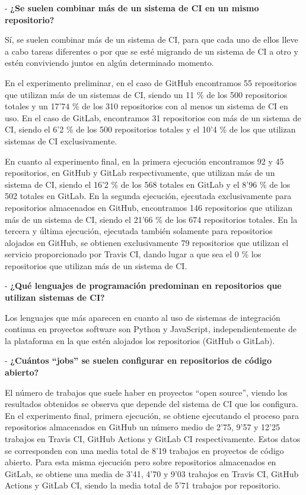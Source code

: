 - \textbf{¿Se suelen combinar más de un sistema de CI en un mismo repositorio?}

Sí, se suelen combinar más de un sistema de CI, para que cada uno de ellos lleve a cabo tareas diferentes o por que se esté migrando de un sistema de CI a otro y estén conviviendo juntos en algún determinado momento.

En el experimento preliminar, en el caso de GitHub encontramos 55 repositorios que utilizan más de un sistemas de CI, siendo un 11 \% de los 500 repositorios totales y un 17'74 \% de los 310 repositorios con al menos un sistema de CI en uso. En el caso de GitLab, encontramos 31 repositorios con más de un sistema de CI, siendo el 6'2 \% de los 500 repositorios totales y el 10'4 \% de los que utilizan sistemas de CI exclusivamente.

En cuanto al experimento final, en la primera ejecución encontramos 92 y 45 repositorios, en GitHub y GitLab respectivamente, que utilizan más de un sistema de CI, siendo el 16'2 \% de los 568 totales en GitLab y el 8'96 \% de los 502 totales en GitLab. En la segunda ejecución, ejecutada exclusivamente para repositorios almacenados en GitHub, encontramos 146 repositorios que utilizan más de un sistema de CI, siendo el 21'66 \% de los 674 repositorios totales. En la tercera y última ejecución, ejecutada también solamente para repositorios alojados en GitHub, se obtienen exclusivamente 79 repositorios que utilizan el servicio proporcionado por Travis CI, dando lugar a que sea el 0 \% los repositorios que utilizan más de un sistema de CI.

- \textbf{¿Qué lenguajes de programación predominan en repositorios que utilizan sistemas de CI?}

Los lenguajes que más aparecen en cuanto al uso de sistemas de integración continua en proyectos software son Python y JavaScript, independientemente de la plataforma en la que estén alojados los repositorios (GitHub o GitLab).

- \textbf{¿Cuántos ``jobs'' se suelen configurar en repositorios de código abierto?}

El número de trabajos que suele haber en proyectos ``open source'', viendo los resultados obtenidos se observa que depende del sistema de CI que los configura. En el experimento final, primera ejecución, se obtiene ejecutando el proceso para repositorios almacenados en GitHub un número medio de 2'75, 9'57 y 12'25 trabajos en Travis CI, GitHub Actions y GitLab CI respectivamente. Estos datos se corresponden con una media total de 8'19 trabajos en proyectos de código abierto. Para esta misma ejecución pero sobre repositorios almacenados en GitLab, se obtiene una media de 3'41, 4'70 y 9'03 trabajos en Travis CI, GitHub Actions y GitLab CI, siendo la media total de 5'71 trabajos por repositorio.

